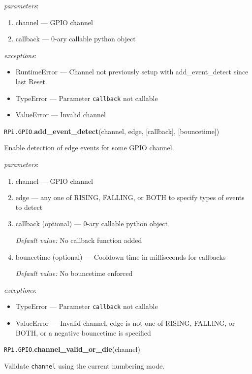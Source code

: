 \documentclass[12pt]{article}
\begin{document}

\textit{parameters}:
\begin{enumerate}
    \item channel --- GPIO channel
    \item callback --- 0-ary callable python object
\end{enumerate}

\textit{exceptions}:
\begin{itemize}
    \item RuntimeError --- Channel not previously setup with add\_event\_detect since last Reset
    \item TypeError --- Parameter \texttt{callback} not callable
    \item ValueError --- Invalid channel
\end{itemize}


\noindent \texttt{RPi.GPIO}.\textbf{add\_event\_detect}(channel, edge, [callback], [bouncetime])

Enable detection of edge events for some GPIO channel.

\textit{parameters}:
\begin{enumerate}
    \item channel --- GPIO channel
    \item edge --- any one of RISING, FALLING, or BOTH to specify types of events to detect
    \item callback (optional) --- 0-ary callable python object
    
    \textit{Default value:} No callback function added
    \item bouncetime (optional) --- Cooldown time in milliseconds for callbacks

    \textit{Default value:} No bouncetime enforced
\end{enumerate}

\textit{exceptions}:
\begin{itemize}
    \item TypeError --- Parameter \texttt{callback} not callable
    \item ValueError --- Invalid channel, edge is not one of RISING, FALLING, or BOTH,  or a negative bouncetime is specified
\end{itemize}

\noindent \texttt{RPi.GPIO}.\textbf{channel\_valid\_or\_die}(channel)

Validate \texttt{channel} using the current numbering mode.
\end{document}
